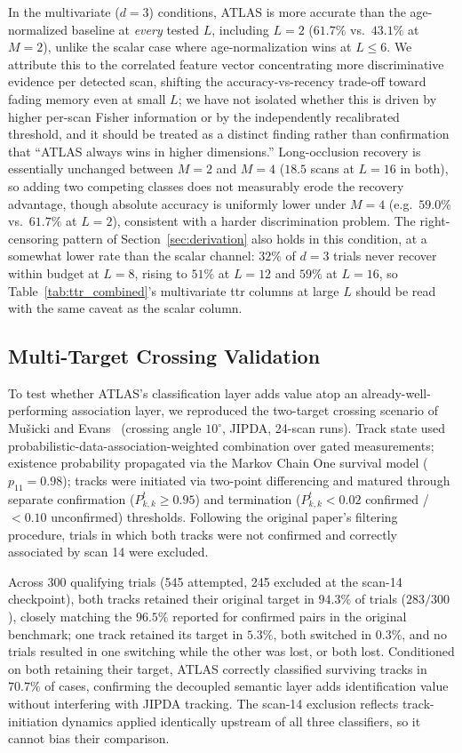 \documentclass[conference]{IEEEtran}
\begin{document}
In the multivariate ($d=3$) conditions, ATLAS is more accurate than the age-normalized baseline at \emph{every} tested $L$, including $L=2$ ($61.7\%$ vs.\ $43.1\%$ at $M{=}2$), unlike the scalar case where age-normalization wins at $L \le 6$. We attribute this to the correlated feature vector concentrating more discriminative evidence per detected scan, shifting the accuracy-vs-recency trade-off toward fading memory even at small $L$; we have not isolated whether this is driven by higher per-scan Fisher information or by the independently recalibrated threshold, and it should be treated as a distinct finding rather than confirmation that ``ATLAS always wins in higher dimensions.'' Long-occlusion recovery is essentially unchanged between $M=2$ and $M=4$ ($18.5$ scans at $L=16$ in both), so adding two competing classes does not measurably erode the recovery advantage, though absolute accuracy is uniformly lower under $M=4$ (e.g.\ $59.0\%$ vs.\ $61.7\%$ at $L=2$), consistent with a harder discrimination problem. The right-censoring pattern of Section~\ref{sec:derivation} also holds in this condition, at a somewhat lower rate than the scalar channel: $32\%$ of $d{=}3$ trials never recover within budget at $L=8$, rising to $51\%$ at $L=12$ and $59\%$ at $L=16$, so Table~\ref{tab:ttr_combined}'s multivariate ttr columns at large $L$ should be read with the same caveat as the scalar column.

\subsection{Multi-Target Crossing Validation}
To test whether ATLAS's classification layer adds value atop an already-well-performing association layer, we reproduced the two-target crossing scenario of Mušicki and Evans~\cite{musicki_2002_joint} (crossing angle $10^\circ$, JIPDA, 24-scan runs). Track state used probabilistic-data-association-weighted combination over gated measurements; existence probability propagated via the Markov Chain One survival model ($p_{11}=0.98$); tracks were initiated via two-point differencing and matured through separate confirmation ($P^t_{k,k}\ge0.95$) and termination ($P^t_{k,k}<0.02$ confirmed / $<0.10$ unconfirmed) thresholds. Following the original paper's filtering procedure, trials in which both tracks were not confirmed and correctly associated by scan 14 were excluded.

Across 300 qualifying trials (545 attempted, 245 excluded at the scan-14 checkpoint), both tracks retained their original target in $94.3\%$ of trials ($283/300$), closely matching the $96.5\%$ reported for confirmed pairs in the original benchmark; one track retained its target in $5.3\%$, both switched in $0.3\%$, and no trials resulted in one switching while the other was lost, or both lost. Conditioned on both retaining their target, ATLAS correctly classified surviving tracks in $70.7\%$ of cases, confirming the decoupled semantic layer adds identification value without interfering with JIPDA tracking. The scan-14 exclusion reflects track-initiation dynamics applied identically upstream of all three classifiers, so it cannot bias their comparison.
\end{document}
